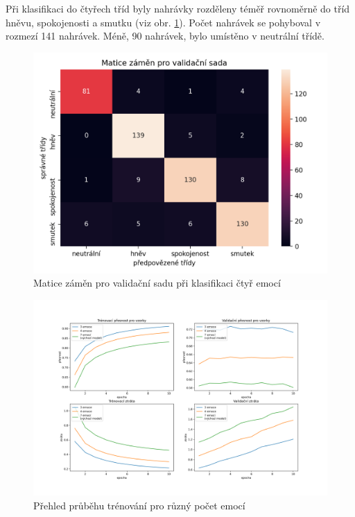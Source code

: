 \documentclass[FM,BP]{tulthesis}
\begin{document}
Při klasifikaci do čtyřech tříd byly nahrávky rozděleny téměř rovnoměrně do tříd hněvu, spokojenosti a smutku (viz obr. \ref{fig:4_emotions-conf_matrix-val}). Počet nahrávek se pohyboval v rozmezí 141 nahrávek. Méně, 90 nahrávek, bylo umístěno v neutrální třídě.

\begin{figure}[!htbp]
\centerline{\includegraphics[scale=.6]{4_emotions-conf_matrix-val.png}}
\caption{Matice záměn pro validační sadu při klasifikaci čtyř emocí}
\label{fig:4_emotions-conf_matrix-val}
\end{figure}
\FloatBarrier

\begin{figure}[!htbp]
\centerline{\includegraphics[scale=.6]{training_course-emotion_reduction.png}}
\caption{Přehled průběhu trénování pro různý počet emocí}
\label{fig:training_course-emotion_reduction}
\end{figure}
\FloatBarrier
\end{document}
